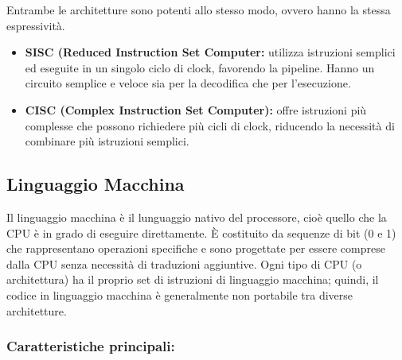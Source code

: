 \documentclass[8pt]{article}
\begin{document}
\vspace{0.2cm}
Entrambe le architetture  sono potenti allo stesso modo, ovvero hanno la stessa espressività.

\vspace{0.5cm}
\begin{itemize}[left=1em, itemsep=0.5em]
    \item \textbf{SISC (Reduced Instruction Set Computer:} utilizza istruzioni semplici ed eseguite in un singolo ciclo di clock, favorendo la pipeline. Hanno un circuito semplice e veloce sia per la decodifica che per l’esecuzione.
    \item \textbf{CISC (Complex Instruction Set Computer):}  offre istruzioni più complesse che possono richiedere più cicli di clock, riducendo la necessità di combinare più istruzioni semplici. 
\end{itemize}

\subsection{\Large Linguaggio Macchina}

\vspace{0.2cm}
Il linguaggio macchina è il lunguaggio nativo del processore, cioè quello che la CPU è in grado di eseguire direttamente.
È costituito da sequenze di bit (0 e 1) che rappresentano operazioni specifiche e sono progettate per essere comprese dalla CPU senza necessità di traduzioni aggiuntive. Ogni tipo di CPU (o architettura) ha il proprio set di istruzioni di linguaggio macchina; quindi, il codice in linguaggio macchina è generalmente non portabile tra diverse architetture.

\subsubsection{{\fontsize{12pt}{12pt}\selectfont Caratteristiche principali:}}
\end{document}

